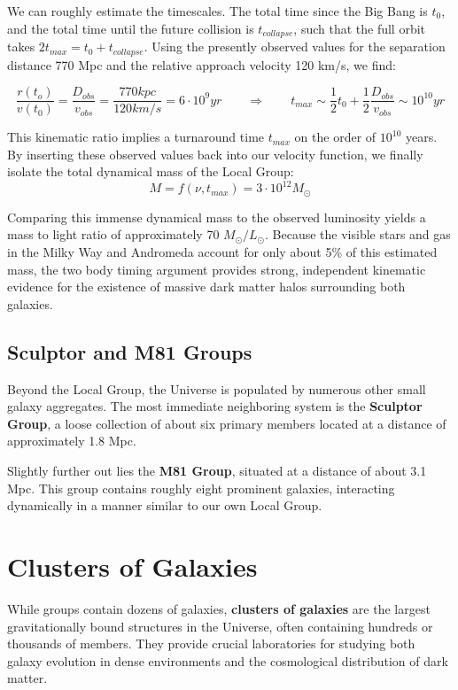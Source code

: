 We can roughly estimate the timescales. The total time since the Big Bang is $t_0$, and the total time until the future collision is $t_{collapse}$, such that the full orbit takes $2 t_{max} = t_0 + t_{collapse}$. Using the presently observed values for the separation distance 770 Mpc and the relative approach velocity 120 km/s, we find:

$$
\frac{r(t_o)}{v(t_0)} = \frac{D_{obs}}{v_{obs}} = \frac{770 kpc}{120 km/s} = 6 \cdot 10^9 yr
\qquad \Rightarrow \qquad t_{max} \sim \frac 12 t_0 + \frac 12 \frac{D_{obs}}{v_{obs}} \sim 10^{10} yr
$$

This kinematic ratio implies a turnaround time $t_{max}$ on the order of $10^{10}$ years. By inserting these observed values back into our velocity function, we finally isolate the total dynamical mass of the Local Group:
$$
M = f(\nu, t_{max}) = 3 \cdot 10^{12} M_{\odot}
$$

Comparing this immense dynamical mass to the observed luminosity yields a mass to light ratio of approximately 70 $M_{\odot}/L_{\odot}$. Because the visible stars and gas in the Milky Way and Andromeda account for only about 5\% of this estimated mass, the two body timing argument provides strong, independent kinematic evidence for the existence of massive dark matter halos surrounding both galaxies.

\subsection{Sculptor and M81 Groups}

Beyond the Local Group, the Universe is populated by numerous other small galaxy aggregates. The most immediate neighboring system is the \textbf{Sculptor Group}, a loose collection of about six primary members located at a distance of approximately 1.8 Mpc. 

Slightly further out lies the \textbf{M81 Group}, situated at a distance of about 3.1 Mpc. This group contains roughly eight prominent galaxies, interacting dynamically in a manner similar to our own Local Group.

\section{Clusters of Galaxies}

While groups contain dozens of galaxies, \textbf{clusters of galaxies} are the largest gravitationally bound structures in the Universe, often containing hundreds or thousands of members. They provide crucial laboratories for studying both galaxy evolution in dense environments and the cosmological distribution of dark matter.

